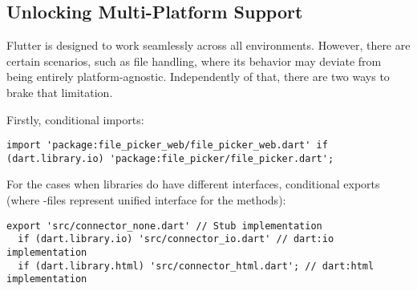 
\subsection{Unlocking Multi-Platform Support}

Flutter is designed to work seamlessly across all environments. However, there are certain scenarios, such as file
handling, where its behavior may deviate from being entirely platform-agnostic. Independently of that, there are two
ways to brake that limitation.

Firstly, conditional imports:

\begin{lstlisting}
import 'package:file_picker_web/file_picker_web.dart' if (dart.library.io) 'package:file_picker/file_picker.dart';
\end{lstlisting}

For the cases when libraries do have different interfaces, conditional exports (where -files represent
unified interface for the methods):

\begin{lstlisting}
export 'src/connector_none.dart' // Stub implementation
  if (dart.library.io) 'src/connector_io.dart' // dart:io implementation
  if (dart.library.html) 'src/connector_html.dart'; // dart:html implementation
\end{lstlisting}
